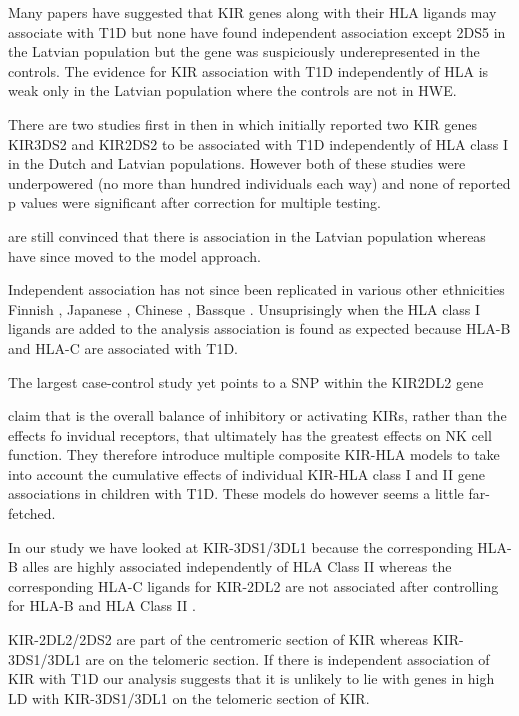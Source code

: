 
Many papers have suggested that KIR genes along with their HLA ligands may associate with T1D but none have found independent association except 2DS5 in the Latvian population
but the gene was suspiciously underepresented in the controls.
The evidence for KIR association with T1D independently of HLA is weak only in the Latvian population where the controls are not in HWE.


There are two studies first in \citeyear{vanderSlik:2003gq} then in \citeyear{NikitinaZake:2004jv} which initially reported two KIR genes KIR3DS2 \citep{vanderSlik:2003gq,NikitinaZake:2004jv} and KIR2DS2 \citep{NikitinaZake:2004jv} to be associated with T1D independently of HLA class I in the Dutch and Latvian populations.
However both of these studies were underpowered (no more than hundred individuals each way) and none of reported p values were significant after correction for multiple testing.

\cite{Shastry:2008id} are still convinced that there is association in the Latvian population whereas \cite{vanderSlik:2007hi,Mehers:2011fj} have since moved to the model approach.

Independent association has not since been replicated in various other ethnicities Finnish \citep{Middleton:2006ba},  Japanese \citep{Mogami:2007gj}, Chinese \citep{Zhi:2011kl}, Bassque \citep{Santin:2006hh}.
Unsuprisingly when the HLA class I ligands are added to the analysis association is found as expected because HLA-B and HLA-C are associated with T1D.

The largest case-control study yet points to a SNP within the KIR2DL2 gene \citep{RamosLopez:2009jf}

\citet{Mehers:2011fj} claim that is the overall balance of inhibitory or activating KIRs, rather than the effects fo invidual receptors, that ultimately
has the greatest effects on NK cell function.
They therefore introduce multiple composite KIR-HLA models \citep{vanderSlik:2007hi} to take into account the cumulative effects of individual KIR-HLA class I
and II gene associations in children with T1D.
These models do however seems a little far-fetched.

In our study we have looked at KIR-3DS1/3DL1 because the corresponding HLA-B alles are highly associated independently of HLA Class II whereas the corresponding HLA-C ligands for KIR-2DL2 are not associated after controlling for HLA-B and HLA Class II \citep{Howson:2009bl}.

KIR-2DL2/2DS2 are part of the centromeric section of KIR whereas KIR-3DS1/3DL1 are on the telomeric section.
If there is independent association of KIR with T1D our analysis suggests that it is unlikely to lie with genes in high LD with KIR-3DS1/3DL1 on the telomeric section of KIR.


